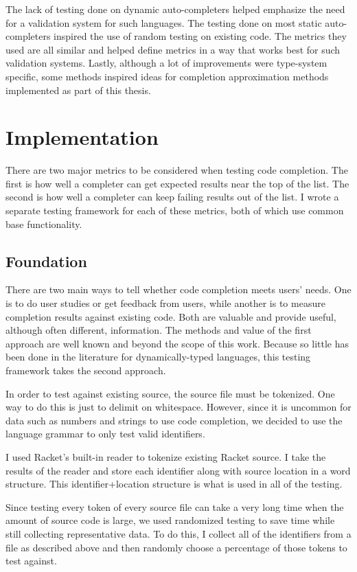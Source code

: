 \documentclass[ms,electronic,twosidetoc,letterpaper,chaptercenter,parttop,lol,lof,lot]{byumsphd}
\begin{document}
The lack of testing done on dynamic auto-completers helped emphasize the need for a validation system for such languages.
The testing done on most static auto-completers inspired the use of random testing on existing code.
The metrics they used are all similar and helped define metrics in a way that works best for such validation systems.
Lastly, although a lot of improvements were type-system specific, some methods inspired ideas for completion approximation methods implemented as part of this thesis.

\chapter{Implementation}

There are two major metrics to be considered when testing code completion.
The first is how well a completer can get expected results near the top of the list.
The second is how well a completer can keep failing results out of the list.
I wrote a separate testing framework for each of these metrics, both of which use common base functionality.

\section{Foundation}

There are two main ways to tell whether code completion meets users' needs.
One is to do user studies or get feedback from users, while another is to measure completion results against existing code.
Both are valuable and provide useful, although often different, information.
The methods and value of the first approach are well known and beyond the scope of this work.
Because so little has been done in the literature for dynamically-typed languages, this testing framework takes the second approach.

In order to test against existing source, the source file must be tokenized.
One way to do this is just to delimit on whitespace.
However, since it is uncommon for data such as numbers and strings to use code completion, we decided to use the language grammar to only test valid identifiers.

I used Racket's built-in reader to tokenize existing Racket source.
I take the results of the reader and store each identifier along with source location in a word structure.
This identifier+location structure is what is used in all of the testing.

Since testing every token of every source file can take a very long time when the amount of source code is large, we used randomized testing to save time while still collecting representative data.
To do this, I collect all of the identifiers from a file as described above and then randomly choose a percentage of those tokens to test against.
\end{document}
